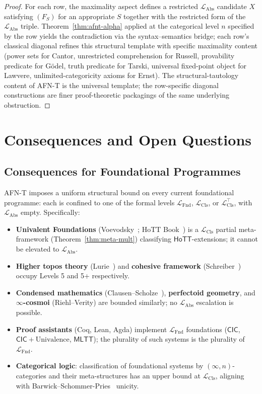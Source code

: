 \documentclass[11pt]{article}
\theoremstyle{plain}
\theoremstyle{definition}
\newcommand{\LFnd}{\mathcal{L}_{\mathrm{Fnd}}}
\newcommand{\LCls}{\mathcal{L}_{\mathrm{Cls}}}
\newcommand{\LClsMax}{\mathcal{L}_{\mathrm{Cls}}^{\top}}
\newcommand{\LAbs}{\mathcal{L}_{\mathrm{Abs}}}
\newcommand{\MLTT}{\mathsf{MLTT}}
\newcommand{\HoTT}{\mathsf{HoTT}}
\newcommand{\CIC}{\mathsf{CIC}}
\begin{document}
\begin{proof}
For each row, the maximality aspect defines a restricted $\LAbs$ candidate $X$ satisfying $(F_S)$ for an appropriate $S$ together with the restricted form of the $\LAbs$ triple. Theorem~\ref{thm:afnt-alpha} applied at the categorical level $n$ specified by the row yields the contradiction via the syntax--semantics bridge; each row's classical diagonal refines this structural template with specific maximality content (power sets for Cantor, unrestricted comprehension for Russell, provability predicate for G\"odel, truth predicate for Tarski, universal fixed-point object for Lawvere, unlimited-categoricity axioms for Ernst). The structural-tautology content of AFN-T is the universal template; the row-specific diagonal constructions are finer proof-theoretic packagings of the same underlying obstruction.
\end{proof}

\section{Consequences and Open Questions}\label{sec:consequences}

\subsection{Consequences for Foundational Programmes}

AFN-T imposes a uniform structural bound on every current foundational programme: each is confined to one of the formal levels $\LFnd$, $\LCls$, or $\LClsMax$, with $\LAbs$ empty. Specifically:
\begin{itemize}\setlength{\itemsep}{1pt}
\item \textbf{Univalent Foundations} (Voevodsky~\cite{VoevodskyFoundations2010}; HoTT Book~\cite{HoTTBook2013}) is a $\LCls$ partial meta-framework (Theorem~\ref{thm:meta-mult}) classifying $\HoTT$-extensions; it cannot be elevated to $\LAbs$.
\item \textbf{Higher topos theory} (Lurie~\cite{LurieHTT}) and \textbf{cohesive framework} (Schreiber~\cite{Schreiber2013}) occupy Levels 5 and 5+ respectively.
\item \textbf{Condensed mathematics} (Clausen--Scholze~\cite{ClausenScholze2019}), \textbf{perfectoid geometry}, and \textbf{$\infty$-cosmoi} (Riehl--Verity) are bounded similarly; no $\LAbs$ escalation is possible.
\item \textbf{Proof assistants} (Coq, Lean, Agda) implement $\LFnd$ foundations ($\CIC$, $\CIC + \mathrm{Univalence}$, $\MLTT$); the plurality of such systems is the plurality of $\LFnd$.
\item \textbf{Categorical logic}: classification of foundational systems by $(\infty, n)$-categories and their meta-structures has an upper bound at $\LCls$, aligning with Barwick--Schommer-Pries~\cite{BarwickSchommerPries2021} unicity.
\end{itemize}
\end{document}
